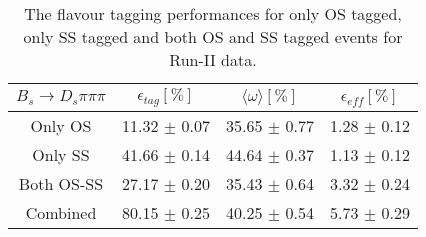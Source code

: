 \begin{table}[h]
\centering
\caption{The flavour tagging performances for only OS tagged, only SS tagged and both OS and SS tagged events for Run-II data.}
\begin{tabular}{c c c c}
\hline
\hline
$ B_s \to D_s \pi \pi \pi$ & $\epsilon_{tag} [\%]$ & $\langle \omega \rangle [\%] $ & $\epsilon_{eff} [\%]$ \\
\hline
Only OS & 11.32 $\pm$ 0.07 & 35.65 $\pm$ 0.77 & 1.28 $\pm$ 0.12\\
Only SS & 41.66 $\pm$ 0.14 & 44.64 $\pm$ 0.37 & 1.13 $\pm$ 0.12\\
Both OS-SS & 27.17 $\pm$ 0.20 & 35.43 $\pm$ 0.64 & 3.32 $\pm$ 0.24\\
\hline
Combined & 80.15 $\pm$ 0.25 & 40.25 $\pm$ 0.54 & 5.73 $\pm$ 0.29\\
\hline
\hline
\end{tabular}
\label{table:tagging_Run2}
\end{table}